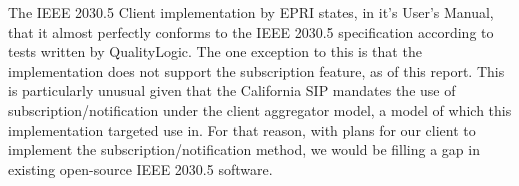 The IEEE 2030.5 Client implementation by EPRI states, in it's User's Manual, that it almost perfectly conforms to the IEEE 2030.5 specification according to tests written by QualityLogic.
The one exception to this is that the implementation does not support the subscription feature, as of this report.
This is particularly unusual given that the California SIP mandates the use of subscription/notification under the client aggregator model, a model of which this implementation targeted use in.
For that reason, with plans for our client to implement the subscription/notification method, we would be filling a gap in existing open-source IEEE 2030.5 software. 





